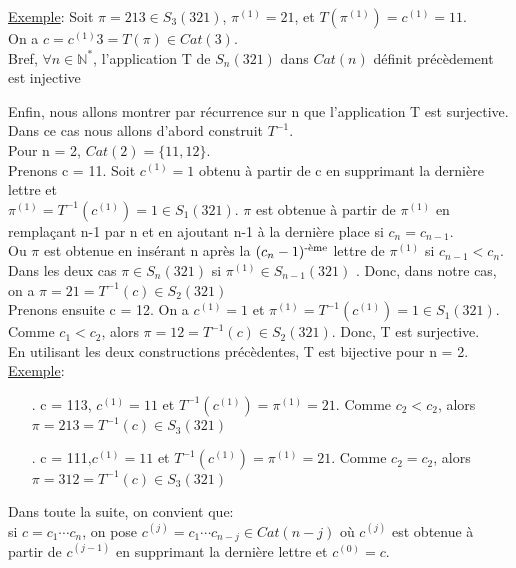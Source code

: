 \documentclass[12pt,a4paper]{extreport}
\begin{document}
		\underline{Exemple}: Soit $\pi = 213 \in  S_{3}(321)$, $\pi^{(1)} = 21 $, et $T(\pi^{(1)})=c^{(1)}=11$.\\
		On a $c=c^{(1)}3=T(\pi) \in Cat(3)$.\\
		Bref, $\forall n \in \mathbb{N}^{*}$, l'application T de $S_{n}(321)$ dans $Cat(n)$ définit précèdement est injective \vspace*{5pt}

		Enfin, nous allons montrer par récurrence sur n que l'application T est surjective. Dans ce cas nous allons d'abord construit $T^{-1}$.\\
		Pour n = 2, $Cat(2)=\{11,12\}$.\\
		Prenons c = 11. Soit $c^{(1)}=1$ obtenu à partir de c en supprimant la dernière lettre et\\
		$\pi^{(1)} = T^{-1}(c^{(1)}) = 1 \in S_{1}(321) $. $\pi$ est obtenue à partir de $\pi^{(1)} $ en remplaçant n-1 par n et en ajoutant n-1 à la dernière place si $c_{n} = c_{n-1} $.\\
		Ou $\pi$ est obtenue en insérant n après la $(c_{n} - 1)\textsuperscript{-ème} $ lettre de $\pi^{(1)} $ si $ c_{n-1} < c_{n} $. Dans les deux cas $\pi \in S_{n}(321)  $ si $\pi^{(1)} \in S_{n-1}(321)$ . Donc, dans notre cas, on a $\pi=21=T^{-1}(c) \in S_{2}(321) $\\
		Prenons ensuite c = 12. On a $c^{(1)}=1$ et $\pi^{(1)} = T^{-1}(c^{(1)}) = 1 \in S_{1}(321) $. Comme $ c_{1} < c_{2} $, alors  $\pi=12=T^{-1}(c) \in S_{2}(321) $. Donc, T est surjective.\\
		En utilisant les deux constructions précèdentes, T est bijective pour n = 2.\\
		\underline{Exemple}:
		\begin{itemize}
			\item[.] c = 113, $c^{(1)}=11 $ et $T^{-1}(c^{(1)})=\pi^{(1)}=21 $. Comme $c_{2} < c_{2}$, alors\\
			 $\pi = 213 = T^{-1}(c) \in  S_{3}(321)$
			 \item[.] c = 111,$c^{(1)}=11 $ et $T^{-1}(c^{(1)})=\pi^{(1)}=21 $. Comme $c_{2} =c_{2}$, alors\\
			 $\pi = 312 = T^{-1}(c) \in  S_{3}(321)$
		\end{itemize}
		Dans toute la suite, on convient que:\\
		si $c = c_{1}\cdots c_{n} $, on pose $c^{(j)}=c_{1}\cdots c_{n-j} \in Cat(n-j)$ où $c^{(j)}$ est obtenue à partir de $c^{(j-1)}$ en supprimant la dernière lettre et $c^{(0)}=c$.\\
\end{document}

